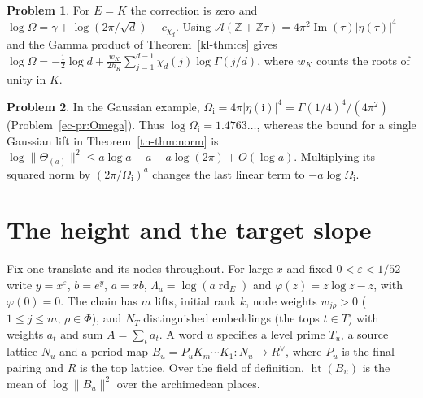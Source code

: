 \documentclass[reqno]{amsart}
\theoremstyle{definition}
\newtheorem{problem}{Problem}[section]
\theoremstyle{plain}
\newcommand{\rd}{\operatorname{rd}}
\newcommand{\htop}{\operatorname{ht}}
\begin{document}
\begin{problem}\label{pr:quadratic}
For $E=K$ the correction is zero and
$\log\Omega=\gamma+\log(2\pi/\sqrt d)-c_{\chi_d}$.
Using $\mathcal A(\mathbb Z+\mathbb Z\tau)=4\pi^2\operatorname{Im}(\tau)
|\eta(\tau)|^4$ and the Gamma product of Theorem~\ref{kl-thm:cs} gives
$\log\Omega=-\tfrac12\log d+
\tfrac{w_K}{2h_K}\sum_{j=1}^{d-1}\chi_d(j)\log\Gamma(j/d)$,
where $w_K$ counts the roots of unity in $K$.
\end{problem}

\begin{problem}\label{pr:gaussian}
In the Gaussian example, $\Omega_{\mathrm i}=4\pi|\eta(\mathrm i)|^4
=\Gamma(1/4)^4/(4\pi^2)$ (Problem~\ref{ec-pr:Omega}).
Thus $\log\Omega_{\mathrm i}=1.4763\ldots$, whereas the bound for a single
Gaussian lift in Theorem~\ref{tn-thm:norm} is
$\log\|\Theta_{(a)}\|^2\le a\log a-a-a\log(2\pi)+O(\log a)$.
Multiplying its squared norm by $(2\pi/\Omega_{\mathrm i})^a$
changes the last linear term to $-a\log\Omega_{\mathrm i}$.
\end{problem}

\section{The height and the target slope}\label{sec:height}

Fix one translate and its nodes throughout.  For large $x$ and fixed
$0<\varepsilon<1/52$ write $y=x^\varepsilon$, $b=e^y$, $a=xb$,
$\Lambda_a=\log(a\rd_E)$ and $\varphi(z)=z\log z-z$, with $\varphi(0)=0$.
The chain has $m$ lifts, initial rank $k$, node weights $w_{j\rho}>0$
($1\le j\le m$, $\rho\in\Phi$), and $N_T$ distinguished embeddings
(the tops $t\in T$) with weights $a_t$ and sum $A=\sum_t a_t$.
A word $u$ specifies a level prime $T_u$, a source lattice $N_u$ and a
period map $B_u=P_u K_m\cdots K_1:N_u\to R^\vee$, where $P_u$ is
the final pairing and $R$ is the top lattice.  Over the field of definition,
$\htop(B_u)$ is the mean of $\log\|B_u\|^2$ over the archimedean places.
\end{document}
